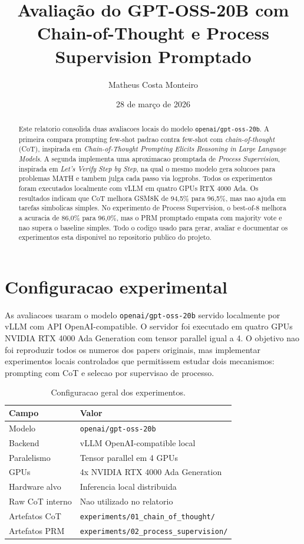 \documentclass[a4paper,12pt]{article}
\title{Avaliação do GPT-OSS-20B com Chain-of-Thought e Process Supervision Promptado}
\author{Matheus Costa Monteiro}
\date{28 de março de 2026}
\begin{document}
\sloppy
{}

\begin{abstract}
Este relatorio consolida duas avaliacoes locais do modelo
\texttt{openai/gpt-oss-20b}. A primeira compara prompting few-shot padrao
contra few-shot com \emph{chain-of-thought} (CoT), inspirada em
\emph{Chain-of-Thought Prompting Elicits Reasoning in Large Language Models}.
A segunda implementa uma aproximacao promptada de \emph{Process Supervision},
inspirada em \emph{Let's Verify Step by Step}, na qual o mesmo modelo gera
solucoes para problemas MATH e tambem julga cada passo via logprobs. Todos os
experimentos foram executados localmente com vLLM em quatro GPUs RTX 4000 Ada.
Os resultados indicam que CoT melhora GSM8K de 94,5\% para 96,5\%, mas nao
ajuda em tarefas simbolicas simples. No experimento de Process Supervision, o
best-of-8 melhora a acuracia de 86,0\% para 96,0\%, mas o PRM promptado empata
com majority vote e nao supera o baseline simples. Todo o codigo usado para
gerar, avaliar e documentar os experimentos esta disponivel no repositorio
publico do projeto.
\end{abstract}

\section{Configuracao experimental}

As avaliacoes usaram o modelo \texttt{openai/gpt-oss-20b} servido localmente
por vLLM com API OpenAI-compatible. O servidor foi executado em quatro GPUs
NVIDIA RTX 4000 Ada Generation com tensor parallel igual a 4. O objetivo nao
foi reproduzir todos os numeros dos papers originais, mas implementar
experimentos locais controlados que permitissem estudar dois mecanismos:
prompting com CoT e selecao por supervisao de processo.

\begin{table}[h]
\centering
\caption{Configuracao geral dos experimentos.}
\label{tab:general_setup}
\begin{tabularx}{\textwidth}{p{}X}
\toprule
Campo & Valor \\
\midrule
Modelo & \texttt{openai/gpt-oss-20b} \\
Backend & vLLM OpenAI-compatible local \\
Paralelismo & Tensor parallel em 4 GPUs \\
GPUs & 4x NVIDIA RTX 4000 Ada Generation \\
Hardware alvo & Inferencia local distribuida \\
Raw CoT interno & Nao utilizado no relatorio \\
Artefatos CoT & \texttt{experiments/01\_chain\_of\_thought/} \\
Artefatos PRM & \texttt{experiments/02\_process\_supervision/} \\
\bottomrule
\end{tabularx}
\end{table}
\end{document}
